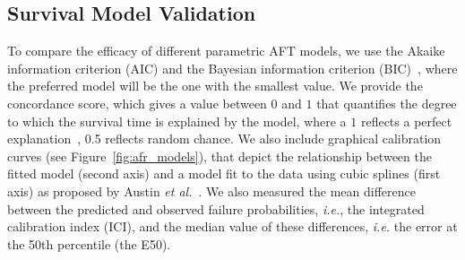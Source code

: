 






\subsection{Survival Model Validation}
\label{metrics}

To compare the efficacy of different parametric AFT models, we use the Akaike information criterion (AIC) and the Bayesian information criterion (BIC)~\cite{stoica2004model,taddy2019business}, where the preferred model will be the one with the smallest value. We provide the
concordance score, which gives a value between $0$ and $1$ that quantifies the degree to which the survival time is explained by the model, where a $1$ reflects a perfect explanation~\cite{kleinbaum1996survival}, 0.5 reflects random chance. We also include graphical calibration curves (see Figure~\ref{fig:afr_models}), that depict the relationship between the fitted model (second axis) and a model fit to the data using cubic splines (first axis) as proposed by Austin \textit{et al.}~\cite{ici}. We also measured the mean difference between the predicted and observed failure probabilities, \textit{i.e.}, the integrated calibration index (ICI), and the median value of these differences, \textit{i.e.} the error at the 50th percentile (the E50). 



